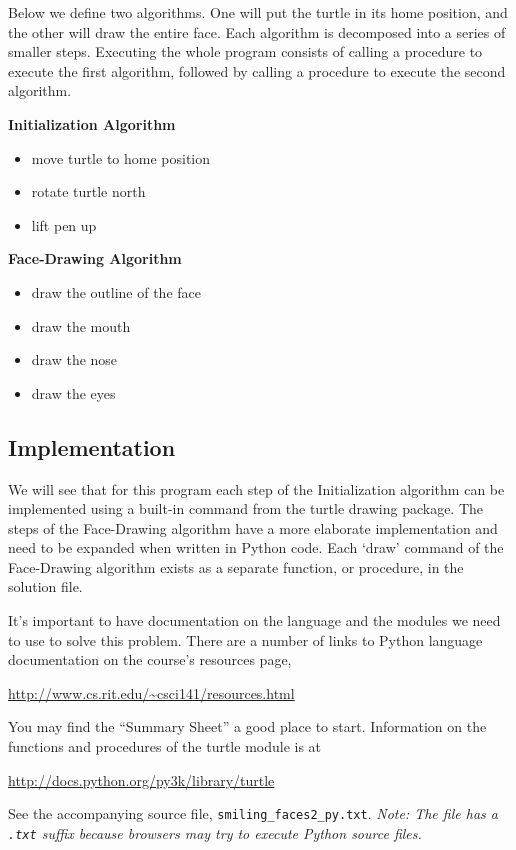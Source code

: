 \documentclass[pdftex,12pt]{artikel3}
\begin{document}
Below we define two algorithms.
One will put the turtle in its home position, 
and the other will draw the entire face.
Each algorithm is decomposed into a series of smaller steps.
Executing the whole program consists of calling a procedure to
execute the first algorithm, followed by calling a procedure to
execute the second algorithm. 

{\bf Initialization Algorithm}
\begin{itemize}
\item 
move turtle to home position
\item
rotate turtle north
\item
lift pen up
\end{itemize}

{\bf Face-Drawing Algorithm}
\begin{itemize}
\item
draw the outline of the face
\item
draw the mouth
\item
draw the nose
\item 
draw the eyes
\end{itemize}

\subsection{Implementation}
We will see that for this program
each step of the Initialization algorithm
can be implemented using a built-in command from the turtle drawing package.
The steps of the Face-Drawing algorithm have a 
more elaborate implementation and need to be expanded when
written in Python code.
Each `draw' command of the Face-Drawing algorithm 
exists as a separate function, or procedure, in the solution file.

It's important to have documentation on 
the language and the modules we need to use to solve this problem.
There are a number of links to Python language documentation on the 
course's resources page,
\begin{tt}
	\url{http://www.cs.rit.edu/~csci141/resources.html}
\end{tt}
You may find the ``Summary Sheet'' a good place to start.
Information on the functions and procedures of the turtle module is at
\begin{tt}
	\url{http://docs.python.org/py3k/library/turtle}
\end{tt}

See the accompanying source file, {\tt smiling\_faces2\_py.txt}.
\emph{Note: The file has a {\tt .txt} suffix because
browsers may try to execute Python source files.}
\end{document}
